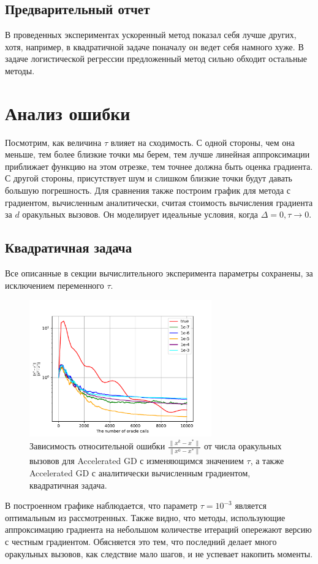 \documentclass{article}
\begin{document}
\subsection{Предварительный отчет}
В проведенных экспериментах ускоренный метод показал себя лучше других, хотя, например, в квадратичной задаче поначалу он ведет себя намного хуже. В задаче логистической регрессии предложенный метод сильно обходит остальные методы.
\section{Анализ ошибки}
Посмотрим, как величина $\tau$ влияет на сходимость. С одной стороны, чем она меньше, тем более близкие точки мы берем, тем лучше линейная аппроксимации приближает функцию на этом отрезке, тем точнее должна быть оценка градиента. С другой стороны, присутствует шум и слишком близкие точки будут давать большую погрешность. Для сравнения также построим график для метода с градиентом, вычисленным аналитически, считая стоимость вычисления градиента за $d$ оракульных вызовов. Он моделирует идеальные условия, когда $\Delta = 0, \tau \to 0$.
\subsection{Квадратичная задача}
Все описанные в секции вычислительного эксперимента параметры сохранены, за исключением переменного $\tau$.\\
\begin{figure}[!htbp]
\centering
  \includegraphics[width=0.7\textwidth]{../figures/Error_analysis_quadratic_sigma=1e-6.pdf}
 \caption{Зависимость относительной ошибки $\frac{\|x^k - x^*\|}{\|x^0 - x^*\|}$ от числа оракульных вызовов для Accelerated GD с изменяющимся значением $\tau$, а также Accelerated GD с аналитически вычисленным градиентом, квадратичная задача.}
  \label{fig:non-stochastic_quadratic}
\end{figure}
В построенном графике наблюдается, что параметр $\tau=10^{-3}$ является оптимальным из рассмотренных. Также видно, что методы, использующие аппроксимацию градиента на небольшом количестве итераций опережают версию с честным градиентом. Обясняется это тем, что последний делает много оракульных вызовов, как следствие мало шагов, и не успевает накопить моменты.
\end{document}
